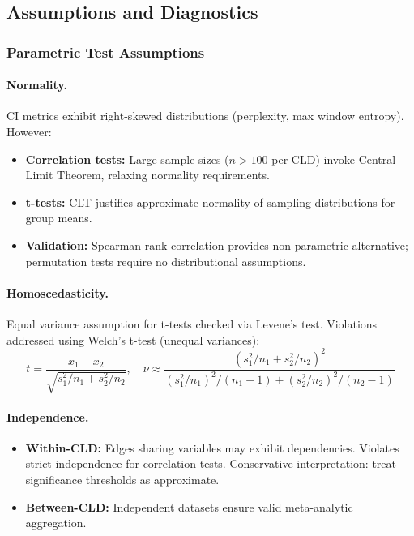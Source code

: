 \subsection{Assumptions and Diagnostics}

\subsubsection{Parametric Test Assumptions}

\paragraph{Normality.} CI metrics exhibit right-skewed distributions (perplexity, max window entropy). However:
\begin{itemize}
    \item \textbf{Correlation tests:} Large sample sizes (\(n > 100\) per CLD) invoke Central Limit Theorem, relaxing normality requirements.
    \item \textbf{t-tests:} CLT justifies approximate normality of sampling distributions for group means.
    \item \textbf{Validation:} Spearman rank correlation provides non-parametric alternative; permutation tests require no distributional assumptions.
\end{itemize}

\paragraph{Homoscedasticity.} Equal variance assumption for t-tests checked via Levene's test. Violations addressed using Welch's t-test (unequal variances):
\[
t = \frac{\bar{x}_1 - \bar{x}_2}{\sqrt{s_1^2/n_1 + s_2^2/n_2}}, \quad \nu \approx \frac{(s_1^2/n_1 + s_2^2/n_2)^2}{(s_1^2/n_1)^2/(n_1-1) + (s_2^2/n_2)^2/(n_2-1)}
\]

\paragraph{Independence.} 
\begin{itemize}
    \item \textbf{Within-CLD:} Edges sharing variables may exhibit dependencies. Violates strict independence for correlation tests. Conservative interpretation: treat significance thresholds as approximate.
    \item \textbf{Between-CLD:} Independent datasets ensure valid meta-analytic aggregation.
\end{itemize}

